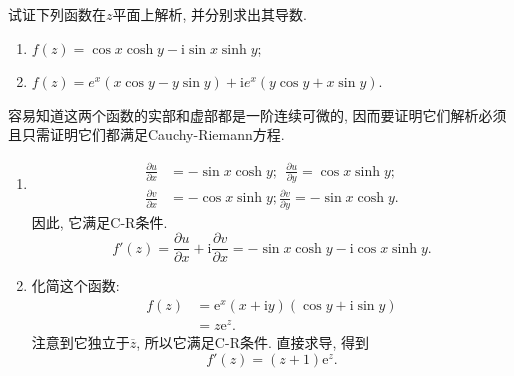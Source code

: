 \begin{yyEx}
	试证下列函数在$z$平面上解析, 并分别求出其导数.
	\begin{enumerate}
		\item $f(z) = \cos x\cosh y - \mathrm{i}\sin x\sinh y$;
		\item $f(z) = e^x(x\cos y-y\sin y) + \mathrm{i}e^x(y\cos y+ x\sin y)$.
	\end{enumerate}
\end{yyEx}

\begin{yySolution}
    容易知道这两个函数的实部和虚部都是一阶连续可微的, 因而要证明它们解析必须且只需证明它们都满足Cauchy-Riemann方程.
        \begin{enumerate}
            \item \begin{equation*}
                \begin{split}
                    \frac{\partial u}{\partial x} &= -\sin x\cosh y;~~\frac{\partial u}{\partial y} = \cos x\sinh y;\\
                    \frac{\partial v}{\partial x} &= -\cos x\sinh y;\frac{\partial v}{\partial y} = -\sin x\cosh y.
                \end{split}
                \end{equation*}
                因此, 它满足C-R条件.
                \begin{equation*}
                    f'(z) = \frac{\partial u}{\partial x}+\mathrm{i}\frac{\partial v}{\partial x} = -\sin x\cosh y -\mathrm{i}\cos x\sinh y.
                \end{equation*}
                \item 化简这个函数:
                \begin{equation*}
                    \begin{split}
                        f(z) &= \mathrm{e}^x(x+\mathrm{i}y)(\cos y+\mathrm{i}\sin y)\\
                        &=z\mathrm{e}^z.
                    \end{split}
                \end{equation*}
            注意到它独立于$\overline{z}$, 所以它满足C-R条件.
            直接求导, 得到\begin{equation*}
                f'(z) = (z+1)\mathrm{e}^z.
            \end{equation*}
        \end{enumerate}
    
\end{yySolution}

